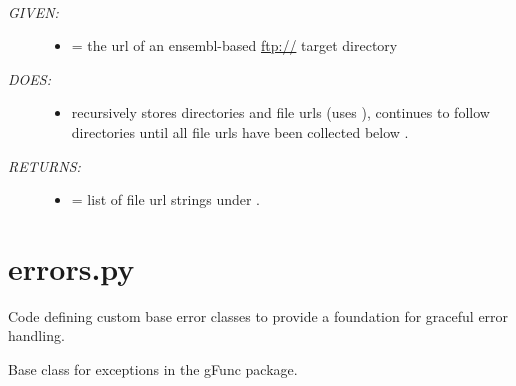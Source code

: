 \documentclass[letterpaper,10pt,english]{sphinxmanual}
\begin{document}
\begin{fulllineitems}
\label{code:gfunc.ensembl_data.web_walk}~\begin{description}
\item[{\emph{GIVEN:}}] \leavevmode\begin{itemize}
\item {} 
 = the url of an ensembl-based \href{ftp://}{ftp://} target directory

\end{itemize}

\item[{\emph{DOES:}}] \leavevmode\begin{itemize}
\item {} 
recursively stores directories and file urls (uses ),
continues to follow directories until all file urls have been
collected below .

\end{itemize}

\item[{\emph{RETURNS:}}] \leavevmode\begin{itemize}
\item {} 
 = list of file url strings under .

\end{itemize}

\end{description}

\end{fulllineitems}

\label{code:module-gfunc.errors}

\section{errors.py}
\label{code:errors-py}
Code defining custom base error classes to provide a foundation for graceful error handling.

\begin{fulllineitems}
\label{code:gfunc.errors.GFuncError}
Base class for exceptions in the gFunc package.

\end{fulllineitems}

\end{document}
